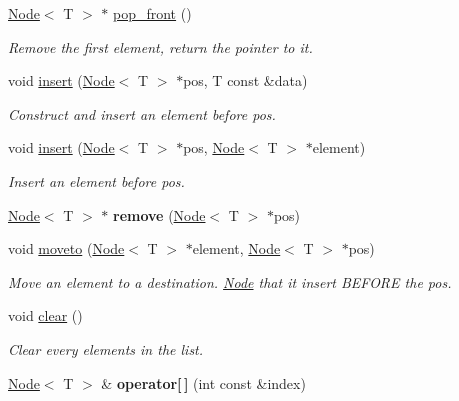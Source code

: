 \begin{DoxyCompactItemize}
\hyperlink{structNode}{Node}$<$ T $>$ $\ast$ \hyperlink{classList_a3188f038a0b9c0a578bccdf7348f42b5}{pop\+\_\+front} ()
\begin{DoxyCompactList}\small\item\em Remove the first element, return the pointer to it. \end{DoxyCompactList}\item 
void \hyperlink{classList_af583e46c2dad89c3f29be38a52dd27bc}{insert} (\hyperlink{structNode}{Node}$<$ T $>$ $\ast$pos, T const \&data)
\begin{DoxyCompactList}\small\item\em Construct and insert an element before pos. \end{DoxyCompactList}\item 
void \hyperlink{classList_ac7fcefb285d5b4991be548342f9b86e9}{insert} (\hyperlink{structNode}{Node}$<$ T $>$ $\ast$pos, \hyperlink{structNode}{Node}$<$ T $>$ $\ast$element)
\begin{DoxyCompactList}\small\item\em Insert an element before pos. \end{DoxyCompactList}\item 
\mbox{\label{classList_a835180f96db12ee4793c77562fbf02be}} 
\hyperlink{structNode}{Node}$<$ T $>$ $\ast$ {\bfseries remove} (\hyperlink{structNode}{Node}$<$ T $>$ $\ast$pos)
\item 
void \hyperlink{classList_a5bfb723e873c6af1e03b085a24ad62f4}{moveto} (\hyperlink{structNode}{Node}$<$ T $>$ $\ast$element, \hyperlink{structNode}{Node}$<$ T $>$ $\ast$pos)
\begin{DoxyCompactList}\small\item\em Move an element to a destination. \hyperlink{structNode}{Node} that it insert B\+E\+F\+O\+RE the pos. \end{DoxyCompactList}\item 
void \hyperlink{classList_ae296516a252e11963dbf963727ce429a}{clear} ()
\begin{DoxyCompactList}\small\item\em Clear every elements in the list. \end{DoxyCompactList}\item 
\mbox{\label{classList_a8112bcf1ec3cbbc681dd54073d299c03}} 
\hyperlink{structNode}{Node}$<$ T $>$ \& {\bfseries operator\mbox{[}$\,$\mbox{]}} (int const \&index)
\item 

\end{DoxyCompactItemize}
